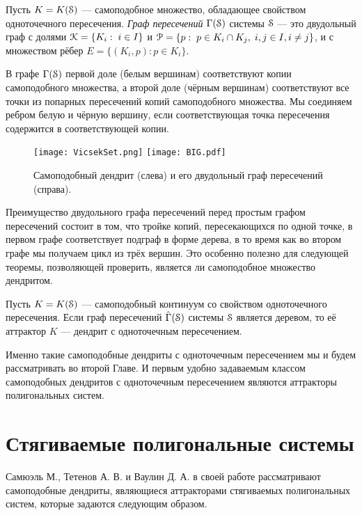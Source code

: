 \begin{definition}
Пусть $K=K({\EuScript S})$ --- самоподобное множество, обладающее свойством одноточечного пересечения.
{\em Граф пересечений} $\Gamma({\EuScript S})$ системы ${\EuScript S}$ --- это двудольный граф с долями ${\EuScript K}=\{K_i:\; i\in I\}$ и ${\EuScript P}=\{p:\;p\in K_i\cap K_j,\; i,j\in I, i\neq j\}$, и с множеством рёбер $E=\{(K_i,p):p\in K_i\}$.
\end{definition}

В графе $\Gamma({\EuScript S})$ первой доле (белым вершинам) соответствуют копии самоподобного множества, а второй доле (чёрным вершинам) соответствуют все точки из попарных пересечений копий самоподобного множества.
Мы соединяем ребром белую и чёрную вершину, если соответствующая точка пересечения содержится в соответствующей копии.

\begin{figure}[H]
\texttt{[image: VicsekSet.png]}
\hfill
\texttt{[image: BIG.pdf]}
\caption{Самоподобный дендрит (слева) и его двудольный граф пересечений (справа).}
\end{figure}

Преимущество двудольного графа пересечений перед простым графом пересечений состоит в том, что тройке копий, пересекающихся по одной точке, в первом графе соответствует подграф в форме дерева, в то время как во втором графе мы получаем цикл из трёх вершин.
Это особенно полезно для следующей теоремы, позволяющей проверить, является ли самоподобное множество дендритом.

\begin{theorem}
\label{thm:fpden}
Пусть $K=K({\EuScript S})$ --- самоподобный континуум со свойством одноточечного пересечения.
Если граф пересечений $\hat\Gamma({\EuScript S})$ системы ${\EuScript S}$ является деревом, то её аттрактор $K$ --- дендрит с одноточечным пересечением.
\end{theorem}



Именно такие самоподобные дендриты с одноточечным пересечением мы и будем рассматривать во второй Главе.  
И первым удобно задаваемым классом самоподобных дендритов с одноточечным пересечением являются аттракторы полигональных систем.

\section{Стягиваемые полигональные системы}

Самюэль М., Тетенов А. В. и Ваулин Д. А. в своей работе \cite{STV2017} рассматривают самоподобные дендриты, являющиеся аттракторами стягиваемых полигональных систем, которые задаются следующим образом.

